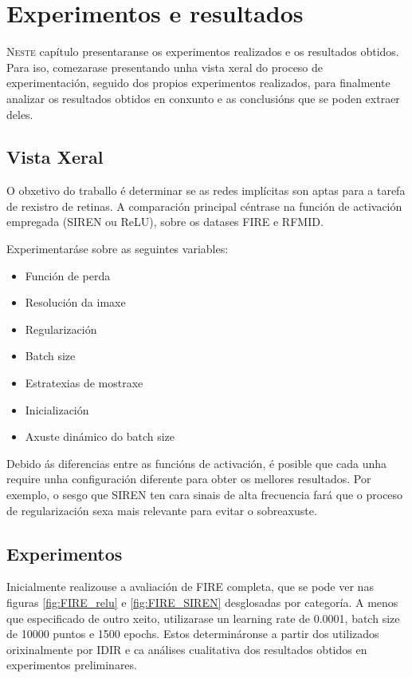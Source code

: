 \chapter{Experimentos e resultados}
\label{chap:Experimentos e resultados}
\lettrine{N}{este} capítulo presentaranse os experimentos realizados e os resultados obtidos.
Para iso, comezarase presentando unha vista xeral do proceso de experimentación, 
seguido dos propios experimentos realizados, para finalmente analizar os resultados obtidos en conxunto e as conclusións que se poden extraer deles.

\section{Vista Xeral}
\label{sec:Vista Xeral}

O obxetivo do traballo é determinar se as redes implícitas son aptas para a tarefa de rexistro de retinas.
A comparación principal céntrase na función de activación empregada (SIREN ou ReLU), sobre os datases FIRE e RFMID.

Experimentaráse sobre as seguintes variables:

\begin{itemize}
    \item Función de perda
    \item Resolución da imaxe
    \item Regularización
    \item Batch size
    \item Estratexias de mostraxe
    \item Inicialización
    \item Axuste dinámico do batch size
\end{itemize}

Debido ás diferencias entre as funcións de activación, é posible que cada unha require unha configuración diferente para obter os mellores resultados.
Por exemplo, o sesgo que SIREN ten cara sinais de alta frecuencia fará que o proceso de regularización sexa mais relevante para evitar o sobreaxuste.

\section{Experimentos}
\label{sec:Experimentos}

Inicialmente realizouse a avaliación de FIRE completa, que se pode ver nas figuras \ref{fig:FIRE_relu} e \ref{fig:FIRE_SIREN} desglosadas por categoría.
A menos que especificado de outro xeito, utilizarase un learning rate de 0.0001, batch size de 10000 puntos e 1500 epochs. 
Estos determináronse a partir dos utilizados orixinalmente por IDIR e ca análises cualitativa dos resultados obtidos en experimentos preliminares.

